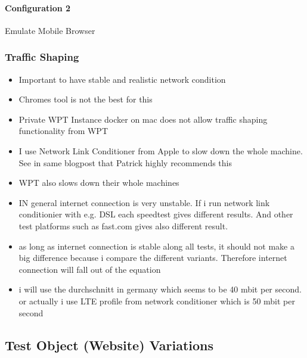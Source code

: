 \paragraph{Configuration 2}

Emulate Mobile Browser



\subsubsection{Traffic Shaping}

\begin{itemize}
\item Important to have stable and realistic network condition
\item Chromes tool is not the best for this %
\item Private WPT Instance docker on mac does not allow traffic shaping functionality from WPT
\item I use Network Link Conditioner from Apple to slow down the whole machine. See in same blogpost that Patrick highly recommends this
\item WPT also slows down their whole machines %
\item IN general internet connection is very unstable. If i run network link conditionier with e.g. DSL each speedtest gives different results. And other test platforms such as fast.com gives also different result.
\item as long as internet connection is stable along all tests, it should not make a big difference because i compare the different variants. Therefore internet connection will fall out of the equation
\item i will use the durchschnitt in germany which seems to be 40 mbit per second. or actually i use LTE profile from network conditioner which is 50 mbit per second 
\end{itemize}









\subsection{Test Object (Website) Variations}

